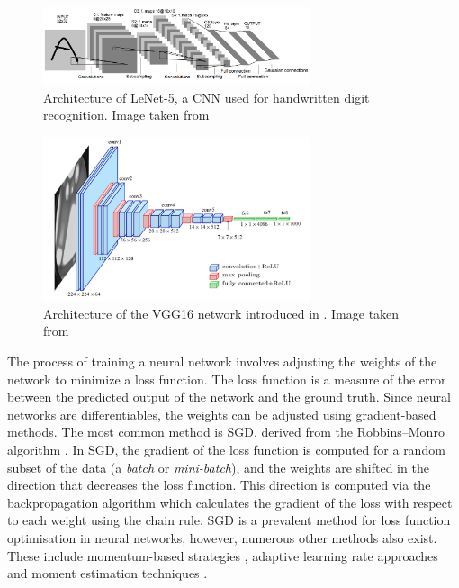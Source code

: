 \begin{figure}[htbp]
    \centering
    \includegraphics[width=0.70\textwidth]{chapter_sota/assets/lenet.png}
    \caption{Architecture of LeNet-5, a \acl{CNN} used for handwritten digit
    recognition. Image taken from \cite{DBLP:journals/pieee/LeCunBBH98}}
    \label{fig:sota:lenet5}
\end{figure}

\begin{figure}[htbp]
    \centering
    \includegraphics[width=0.7\textwidth]{chapter_sota/assets/vgg16.png}
    \caption{Architecture of the VGG16 network introduced in
    \cite{DBLP:journals/corr/SimonyanZ14a}. Image taken from
    \cite{ferguson2017automatic}}
    \label{fig:sota:vgg16}
\end{figure}


The process of training a neural network involves adjusting the weights of the
network to minimize a loss function. The loss function is a measure of the error
between the predicted output of the network and the ground truth. Since neural
networks are differentiables, the weights can be adjusted using gradient-based
methods. The most common method is \acf{SGD}, derived from the Robbins–Monro
algorithm \cite{robbins1951stochastic}. In \ac{SGD}, the gradient of the loss
function is computed for a random subset of the data (a \emph{batch} or
\emph{mini-batch}), and the weights are shifted in the direction that decreases
the loss function. This direction is computed via the backpropagation algorithm
\cite{rumelhart1986learning} which calculates the gradient of the loss with
respect to each weight using the chain rule. \acl{SGD} is a prevalent method for
loss function optimisation in neural networks, however, numerous other methods
also exist. These include momentum-based strategies
\cite{sutskever2013importance}, adaptive learning rate approaches
\cite{zeiler2012adadelta} and moment estimation techniques
\cite{kingma2014adam}.\\

